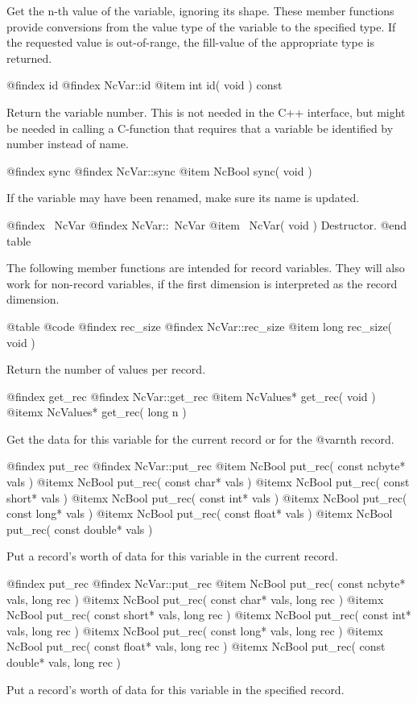 Get the n-th value of the variable, ignoring its shape.  These member
functions provide conversions from the value type of the variable to the
specified type.  If the requested value is out-of-range, the fill-value of the
appropriate type is returned.

@findex id
@findex NcVar::id
@item int id( void ) const

Return the variable number.  This is not needed in the C++ interface,
but might be needed in calling a C-function that requires that a variable
be identified by number instead of name.

@findex sync
@findex NcVar::sync
@item NcBool sync( void )

If the variable may have been renamed, make sure its name is updated.

@findex ~NcVar
@findex NcVar::~NcVar
@item ~NcVar( void )
Destructor.
@end table

The following member functions are intended for record variables.  They
will also work for non-record variables, if the first dimension is
interpreted as the record dimension.

@table @code
@findex rec_size
@findex NcVar::rec_size
@item long rec_size( void )

Return the number of values per record.

@findex get_rec
@findex NcVar::get_rec
@item NcValues* get_rec( void )
@itemx NcValues* get_rec( long n )

Get the data for this variable for the current record or for the
@var{n}th record.

@findex put_rec
@findex NcVar::put_rec
@item  NcBool put_rec( const ncbyte* vals )
@itemx NcBool put_rec( const char* vals )
@itemx NcBool put_rec( const short* vals )
@itemx NcBool put_rec( const int* vals )
@itemx NcBool put_rec( const long* vals )
@itemx NcBool put_rec( const float* vals )
@itemx NcBool put_rec( const double* vals )

Put a record's worth of data for this variable in the current record.

@findex put_rec
@findex NcVar::put_rec
@item  NcBool put_rec( const ncbyte* vals, long rec )
@itemx NcBool put_rec( const char* vals, long rec )
@itemx NcBool put_rec( const short* vals, long rec )
@itemx NcBool put_rec( const int* vals, long rec )
@itemx NcBool put_rec( const long* vals, long rec )
@itemx NcBool put_rec( const float* vals, long rec )
@itemx NcBool put_rec( const double* vals, long rec )

Put a record's worth of data for this variable in the specified record.

